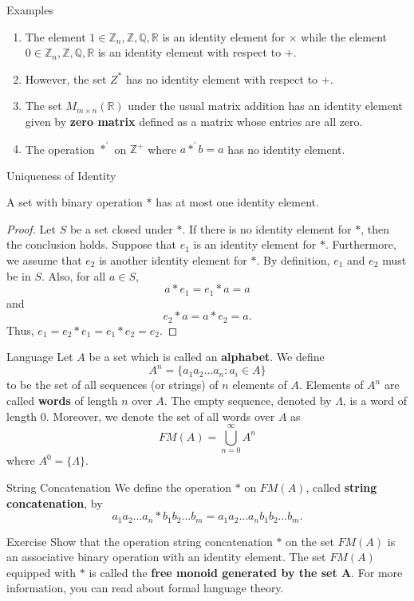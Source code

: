 \documentclass{beamer}
\begin{document}
\begin{frame}{Examples}
\begin{enumerate}
\justifying
\item The element $1 \in \mathbb{Z}_n, \mathbb{Z}, \mathbb{Q}, \mathbb{R}$ is an identity element for $\times$ while the element $0 \in \mathbb{Z}_n, \mathbb{Z}, \mathbb{Q}, \mathbb{R}$ is an identity element with respect to $+$. 
\pause
\item However, the set $Z^*$ has no identity element with respect to $+$.
\pause
\item The set $M_{m \times n}(\mathbb{R})$ under the usual matrix addition has an identity element given by \textbf{zero matrix} defined as a matrix whose entries are all zero.
\pause
\item The operation $*^{\prime}$ on $\mathbb{Z}^+$ where $a *^{\prime} b = a$ has no identity element.  
\end{enumerate}
\end{frame}

\begin{frame}{Uniqueness of Identity}
\begin{theorem}
\justifying
A set with binary operation $*$ has at most one identity element.
\end{theorem}
\pause
\begin{proof}
\justifying
Let $S$ be a set closed under $*$. If there is no identity element for $*$, then the conclusion holds. Suppose that $e_1$ is an identity element for $*$. Furthermore, we assume that $e_2$ is another identity element for $*$. By definition, $e_1$ and $e_2$ must be in $S$. Also, for all $a \in S$,
\[
a * e_1 = e_1 * a = a
\]
and
\[
e_2 * a = a * e_2 = a.
\]
Thus, $e_1 = e_2 * e_1 = e_1 * e_2 = e_2$.
\end{proof}
\end{frame}

\begin{frame}{Language}
\justifying
Let $A$ be a set which is called an \textbf{alphabet}. We define 
\[
A^n = \{a_{1}a_{2}\dots a_{n} : a_i \in A\}
\]
to be the set of all sequences (or strings) of $n$ elements of $A$. Elements of $A^n$ are called \textbf{words} of length $n$ over $A$. The empty sequence, denoted by $\Lambda$, is a word of length $0$. Moreover, we denote the set of all words over $A$ as
\[
FM(A) = \bigcup_{n = 0}^{\infty}A^n
\]
where $A^0 = \{\Lambda\}$.
\end{frame}

\begin{frame}{String Concatenation}
\justifying
We define the operation $*$ on $FM(A)$, called \textbf{string concatenation}, by
\[
a_1 a_2 \dots a_n * b_1 b_2 \dots b_m = a_1 a_2 \dots a_n b_1 b_2 \dots b_m.
\]

\begin{block}{Exercise}
\justifying
Show that the operation string concatenation $*$ on the set $FM(A)$ is an associative binary operation with an identity element. The set $FM(A)$ equipped with $*$ is called the \textbf{free monoid generated by the set $\boldsymbol{A}$}. For more information, you can read about formal language theory.
\end{block}
\end{frame}
\end{document}
